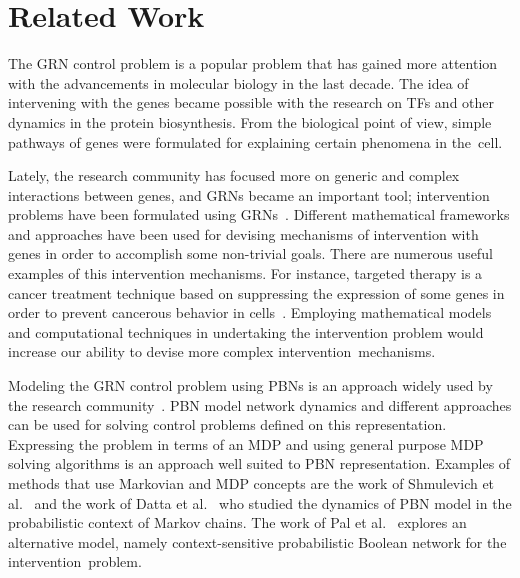 \chapter{Related Work}
\label{chapter:relatedwork}

The GRN control problem is a popular problem that has gained more attention with the advancements in
molecular biology in the last decade. The idea of intervening with the genes became possible with the
research on TFs and other dynamics in the protein biosynthesis. From the biological point of view, simple
pathways of genes were formulated for explaining certain phenomena in the~cell.

Lately, the research community has focused more on generic and complex interactions between genes, and GRNs
became an important tool; intervention problems have been formulated using GRNs~\cite{Datta03,Pal08,Pal06}.
Different mathematical frameworks and approaches have been used for devising mechanisms of intervention with
genes in order to accomplish some non-trivial goals. There are numerous useful examples of this intervention
mechanisms. For instance, targeted therapy is a cancer treatment technique based on suppressing the
expression of some genes in order to prevent cancerous behavior in cells~\cite{Green04}. Employing
mathematical models and computational techniques in undertaking the intervention problem would increase our
ability to devise more complex intervention~mechanisms.

Modeling the GRN control problem using PBNs is an approach widely used by the research
community~\cite{Kauffman93}. PBN model network dynamics and different approaches can be used for solving
control problems defined on this representation. Expressing the problem in terms of an MDP and using general
purpose MDP solving algorithms is an approach well suited to PBN representation. Examples of methods that use
Markovian and MDP concepts are the work of Shmulevich et al.~\cite{Shmulevich02} and the work of Datta et
al.~\cite{Datta03} who studied the dynamics of PBN model in the probabilistic context of Markov chains. The
work of Pal et al.~\cite{Pal05} explores an alternative model, namely context-sensitive probabilistic Boolean
network for the intervention~problem.

